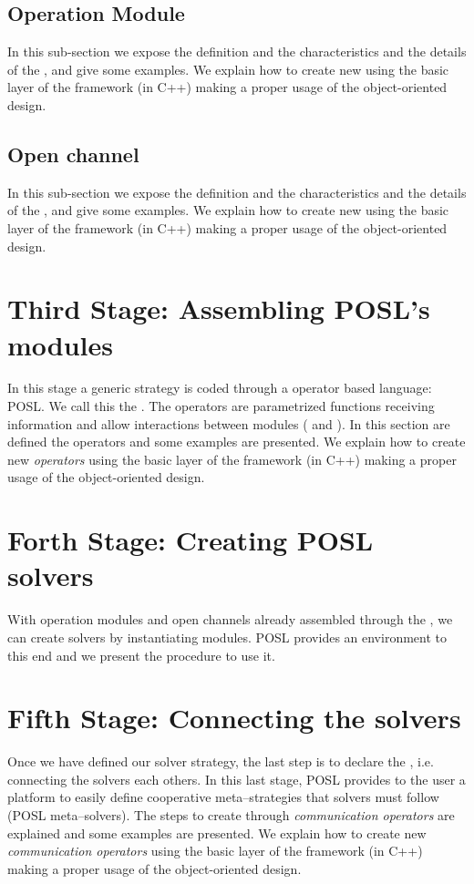 \documentclass[a4paper]{book} %
\newcommand{\posl}{{\sc POSL}}
\begin{document}
\subsection{Operation Module}

In this sub-section we expose the definition and the characteristics and the details of the \om, and give some examples. We explain how to create new \oms{} using the basic layer of the framework (in C++) making a proper usage of the object-oriented design.

\subsection{Open channel}

In this sub-section we expose the definition and the characteristics and the details of the \opch, and give some examples. We explain how to create new \opchs{} using the basic layer of the framework (in C++) making a proper usage of the object-oriented design.

\section{Third Stage: Assembling \posl's modules}

In this stage a generic strategy is coded through a operator based language: \posl. We call this the \cstr. The operators are parametrized functions receiving information and allow interactions between modules (\oms{} and \opchs). In this section are defined the operators and some examples are presented. We explain how to create new \textit{operators} using the basic layer of the framework (in C++) making a proper usage of the object-oriented design.

\section{Forth Stage: Creating \posl{} solvers}

With operation modules and open channels already assembled through the \cstr{}, we can create solvers by instantiating modules. \posl{} provides an environment to this end and we present the procedure to use it. 

\section{Fifth Stage: Connecting the solvers}

Once we have defined our solver strategy, the last step is to declare the \commchs, i.e. connecting the solvers each others. In this last stage, \posl{} provides to the user a platform to easily define cooperative meta--strategies that solvers must follow (\posl{} meta--solvers). The steps to create \commchs{} through \textit{communication operators} are explained and some examples are presented. We explain how to create new \textit{communication operators} using the basic layer of the framework (in C++) making a proper usage of the object-oriented design.
\end{document}
